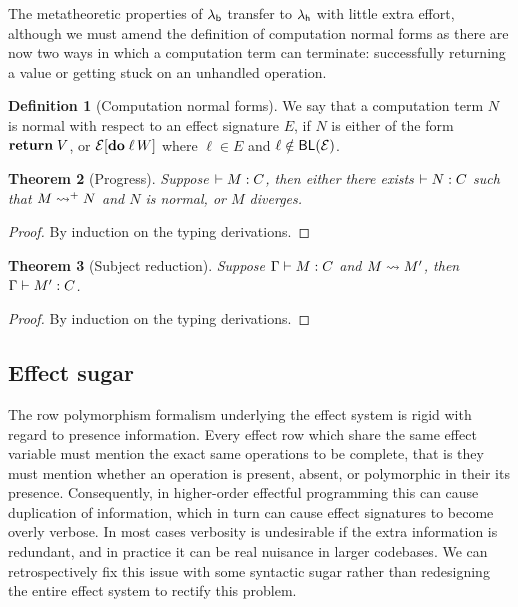 \documentclass[12pt,phd,lfcs,twoside,openright,logo,leftchapter,normalheadings]{infthesis}
\theoremstyle{plain}
\newtheorem{theorem}{Theorem}[chapter]
\theoremstyle{definition}
\newtheorem{definition}[theorem]{Definition}
\begin{document}
The metatheoretic properties of $\lambda_{\mathsf{b}}$ transfer to $\lambda_{\mathsf{h}}$ with
little extra effort, although we must amend the definition of
computation normal forms as there are now two ways in which a
computation term can terminate: successfully returning a value or
getting stuck on an unhandled operation.
%
\begin{definition}[Computation normal forms]\label{def:comp-normal-form}
  We say that a computation term $N$ is normal with respect to an
  effect signature $E$, if $N$ is either of the form $\mathbf{return}\;V$, or
  $\mathcal{E}[\mathbf{do}\;\ell\,W]$ where $\ell \in E$ and $\ell \notin \mathsf{BL}(\mathcal{E})$.
\end{definition}
%

\begin{theorem}[Progress]
  Suppose $\vdash M : C$, then either there exists $\vdash N : C$
  such that $M \leadsto^+ N$ and $N$ is normal, or $M$ diverges.
\end{theorem}
%
\begin{proof}
  By induction on the typing derivations.
\end{proof}
%
\begin{theorem}[Subject reduction]
  Suppose $\Gamma \vdash M : C$ and $M \leadsto M'$, then
  $\Gamma \vdash M' : C$.
\end{theorem}
%
\begin{proof}
  By induction on the typing derivations.
\end{proof}

\subsection{Effect sugar}
\label{sec:effect-sugar}

The row polymorphism formalism underlying the effect system is rigid
with regard to presence information. Every effect row which share the
same effect variable must mention the exact same operations to be
complete, that is they must mention whether an operation is present,
absent, or polymorphic in their its presence. Consequently, in
higher-order effectful programming this can cause duplication of
information, which in turn can cause effect signatures to become
overly verbose. In most cases verbosity is undesirable if the extra
information is redundant, and in practice it can be real nuisance in
larger codebases.
%
We can retrospectively fix this issue with some syntactic sugar rather
than redesigning the entire effect system to rectify this problem.
\end{document}

